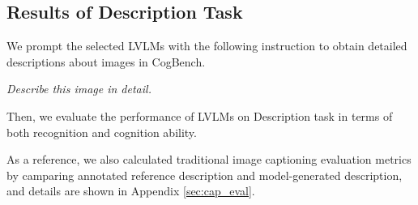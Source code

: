 


\subsection{Results of Description Task}



We prompt the selected LVLMs with the following instruction to obtain detailed descriptions about images in CogBench.

\textit{Describe this image in detail.}

Then, we evaluate the performance of LVLMs on Description task in terms of both recognition and cognition ability.

As a reference, we also calculated traditional image captioning evaluation metrics by camparing annotated reference description and model-generated description, and details are shown in Appendix \ref{sec:cap_eval}.

